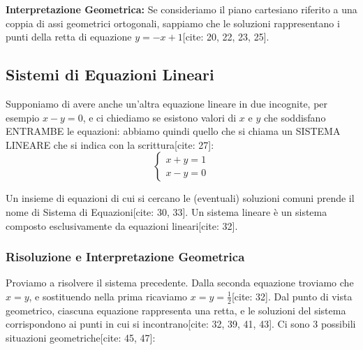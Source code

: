 \documentclass[11pt,a4paper]{article}
\begin{document}
\textbf{Interpretazione Geometrica:} Se consideriamo il piano cartesiano riferito a una coppia di assi geometrici ortogonali, sappiamo che le soluzioni rappresentano i punti della retta di equazione $y = -x + 1$[cite: 20, 22, 23, 25].

\subsection{Sistemi di Equazioni Lineari}
Supponiamo di avere anche un'altra equazione lineare in due incognite, per esempio $x - y = 0$, e ci chiediamo se esistono valori di $x$ e $y$ che soddisfano ENTRAMBE le equazioni: abbiamo quindi quello che si chiama un SISTEMA LINEARE che si indica con la scrittura[cite: 27]:
\begin{equation}
\begin{cases}
x + y = 1 \\
x - y = 0
\end{cases}
\end{equation}

\begin{definition}
Un insieme di equazioni di cui si cercano le (eventuali) soluzioni comuni prende il nome di Sistema di Equazioni[cite: 30, 33]. Un sistema lineare è un sistema composto esclusivamente da equazioni lineari[cite: 32].
\end{definition}

\subsubsection{Risoluzione e Interpretazione Geometrica}
Proviamo a risolvere il sistema precedente. Dalla seconda equazione troviamo che $x = y$, e sostituendo nella prima ricaviamo $x = y = \frac{1}{2}$[cite: 32].
Dal punto di vista geometrico, ciascuna equazione rappresenta una retta, e le soluzioni del sistema corrispondono ai punti in cui si incontrano[cite: 32, 39, 41, 43]. 
Ci sono 3 possibili situazioni geometriche[cite: 45, 47]:
\end{document}
